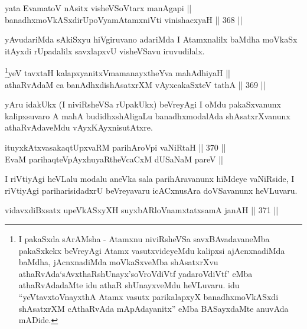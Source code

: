 
\begin{shl}
yata EvamatoV nAsitx visheVSoV\s tarx manAgapi || \\
banadhxmoVkASxdirUpoV\s yamAtamxniVti vinishacxyaH \hfill || 368 ||  
\end{shl}

\begin{artha}
yAvudariMda sAkiSxyu hiVgiruvano adariMda I Atamxnalilx baMdha moVkaSx
itAyxdi rUpadalilx savxlapxvU visheVSavu iruvudilalx.
\end{artha}


\begin{shl}
\footnote{I pakaSxda sArAMsha - Atamxnu niviRsheVSa savxBAvadavaneMba pakaSxkekx beVreyAgi Atamx vasutxvideyeMdu kalipxsi ajAcnxnadiMda baMdha, jAcnxnadiMda moVkaSxveMba shAsatxrXvu athaRvAda\break `sAvxthaRshUnayx'soV\s roVdiVtf yadaroVdiVtf' eMba athaRvAdadaMte idu athaR shUnayxveMdu heVLuvaru. idu ``yeVtavxtoVnayxthA Atamx vasutx parikalapxyX banadhxmoVkASxdi shAsatxrXM cAthaRvAda mApAdayanitx'' eMba BASayxdaMte anuvAda mADide.}yeV tavxtaH kalapxyanitxVmamanayxtheYva mahAdhiyaH || \\
athaRvAdaM ca banAdhxdishAsatxrXM vAyxcakaSxteV tathA \hfill || 369 ||  
\end{shl}

\begin{artha}
yAru idakUkx (I niviRsheVSa rUpakUkx) beVreyAgi I oMdu
pakaSxvanunx kalipxsuvaro A mahA budidhxshAligaLu banadhxmodalAda
shAsatxrXvanunx athaRvAdaveMdu vAyxKAyxnisutAtxre.
\end{artha}

\begin{shl}
ituyxkAtxvasakaqtUpxvaRM parihAroV\s pi vaNiRtaH \hfill || 370 ||  \\
EvaM parihaqteV\s pAyxhuyaRtheVcaCxM dUSaNaM pareV ||
\end{shl}

\begin{artha}
I riVtiyAgi heVLalu modalu aneVka sala parihAravanunx hiMdeye
vaNiRside, I riVtiyAgi pariharisidadxrU beVreyavaru icACxnusAra
doVSavanunx heVLuvaru.
\end{artha}

\begin{shl}
vidavxdiBxsatx upeVkASxyXH suyxbARloVnamxtatxsamA janAH \hfill || 371 ||  
\end{shl}

